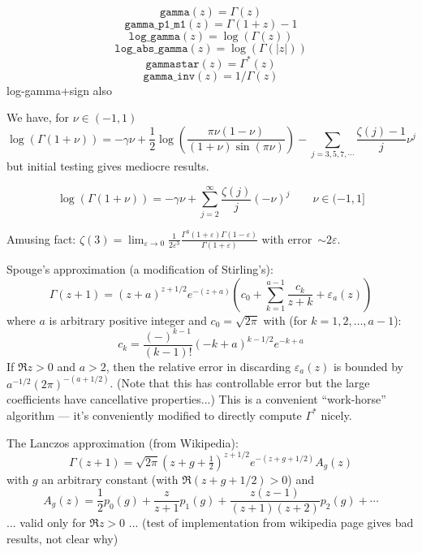 \documentclass[10pt,dvipdfmx,letterpaper,twoside]{article}
\newcommand{\F}[1]{{\mathtt{#1}}}
\let\gam=\gamma
\let\Gam=\Gamma
\let\eps=\varepsilon
\begin{document}
\[ \F{gamma}(z) = \Gam(z) \]
\[ \F{gamma\_p1\_m1}(z) = \Gam(1+z)-1 \]
\[ \F{log\_gamma}(z) = \log(\Gam(z)) \]
\[ \F{log\_abs\_gamma}(z) = \log(\Gam(|z|)) \]
\[ \F{gammastar}(z) = \Gam^*(z) \]
\[ \F{gamma\_inv}(z) = 1/\Gam(z) \]
log-gamma+sign also

We have, for $\nu\in(-1,1)$
\[ \log(\Gam(1+\nu)) = -\gam\nu + \frac12\log(\frac{\pi\nu(1-\nu)}{(1+\nu)\sin(\pi\nu)}) - \sum_{j=3,5,7,\cdots}\frac{\zeta(j)-1}{j}\nu^j\]
but initial testing gives mediocre results.

\[ \log(\Gam(1+\nu)) = -\gam\nu + \sum_{j=2}^\infty\frac{\zeta(j)}{j}(-\nu)^j \qquad \nu\in(-1,1] \]

Amusing fact: $\zeta(3) = \lim_{\eps\to0}\frac{1}{2\eps^3}\frac{\Gam^3(1+\eps)\Gam(1-\eps)}{\Gam(1+\eps)}$ with error~$\sim2\eps$.

Spouge's approximation (a modification of Stirling's):
\[ \Gam(z+1) = (z+a)^{z+1/2}e^{-(z+a)}\left( c_0 + \sum_{k=1}^{a-1}\frac{c_k}{z+k} + \eps_a(z) \right) \]
where $a$ is arbitrary positive integer and $c_0=\sqrt{2\pi}$ with (for $k=1,2,\dots,a-1$):
\[ c_k = \frac{(-)^{k-1}}{(k-1)!}(-k+a)^{k-1/2}e^{-k+a} \]
If $\Re z>0$ and $a>2$, then the relative error in discarding $\eps_a(z)$ is bounded by $a^{-1/2}(2\pi)^{-(a+1/2)}$.
(Note that this has controllable error but the large coefficients have cancellative properties...)
This is a convenient ``work-horse'' algorithm --- it's conveniently modified to directly compute $\Gam^*$ nicely.

The Lanczos approximation (from Wikipedia):
\[ \Gam(z+1) = \sqrt{2\pi}(z+g+\tfrac12)^{z+1/2} e^{-(z+g+1/2)} A_g(z) \]
with $g$ an arbitrary constant (with $\Re(z+g+1/2)>0$) and
\[ A_g(z) = \frac12 p_0(g) + \frac{z}{z+1} p_1(g) + \frac{z(z-1)}{(z+1)(z+2)} p_2(g) + \cdots \]
... valid only for $\Re z>0$ ... (test of implementation from wikipedia page gives bad results, not clear why)
\end{document}
